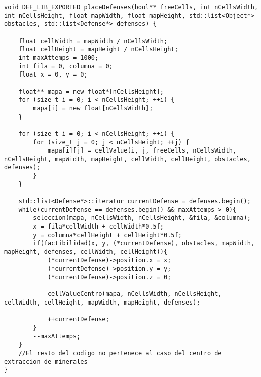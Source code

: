 \begin{lstlisting}
void DEF_LIB_EXPORTED placeDefenses(bool** freeCells, int nCellsWidth, int nCellsHeight, float mapWidth, float mapHeight, std::list<Object*> obstacles, std::list<Defense*> defenses) {

    float cellWidth = mapWidth / nCellsWidth;
    float cellHeight = mapHeight / nCellsHeight;
    int maxAttemps = 1000;
    int fila = 0, columna = 0;
    float x = 0, y = 0;

    float** mapa = new float*[nCellsHeight];
    for (size_t i = 0; i < nCellsHeight; ++i) {
        mapa[i] = new float[nCellsWidth];
    }

    for (size_t i = 0; i < nCellsHeight; ++i) {
        for (size_t j = 0; j < nCellsHeight; ++j) {
            mapa[i][j] = cellValue(i, j, freeCells, nCellsWidth, nCellsHeight, mapWidth, mapHeight, cellWidth, cellHeight, obstacles, defenses);
        }
    }

    std::list<Defense*>::iterator currentDefense = defenses.begin();
    while(currentDefense == defenses.begin() && maxAttemps > 0){
        seleccion(mapa, nCellsWidth, nCellsHeight, &fila, &columna);
        x = fila*cellWidth + cellWidth*0.5f;
        y = columna*cellHeight + cellHeight*0.5f;
        if(factibilidad(x, y, (*currentDefense), obstacles, mapWidth, mapHeight, defenses, cellWidth, cellHeight)){
            (*currentDefense)->position.x = x;
            (*currentDefense)->position.y = y;
            (*currentDefense)->position.z = 0;

            cellValueCentro(mapa, nCellsWidth, nCellsHeight, cellWidth, cellHeight, mapWidth, mapHeight, defenses);

            ++currentDefense;
        }
        --maxAttemps;
    }
    //El resto del codigo no pertenece al caso del centro de extraccion de minerales
}


\end{lstlisting}
%
\newpage